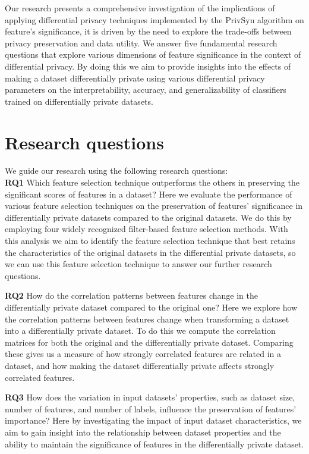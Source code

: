 Our research presents a comprehensive investigation of the implications of applying differential privacy techniques implemented by the PrivSyn algorithm \cite{privsyn} on feature's significance, it is driven by the need to explore the trade-offs between privacy preservation and data utility. We answer five fundamental research questions that explore various dimensions of feature significance in the context of differential privacy. By doing this we aim to provide insights into the effects of making a dataset differentially private using various differential privacy parameters on the interpretability, accuracy, and generalizability of classifiers trained on differentially private datasets.



\section{Research questions}
We guide our research using the following research questions:\\
\textbf{RQ1} Which feature selection technique outperforms the others in preserving the significant scores of features in a dataset?
Here we evaluate the performance of various feature selection techniques on the preservation of features' significance in differentially private datasets compared to the original datasets. We do this by employing four widely recognized filter-based feature selection methods. With this analysis we aim to identify the feature selection technique that best retains the characteristics of the original datasets in the differential private datasets, so we can use this feature selection technique to answer our further research questions.

\textbf{RQ2} How do the correlation patterns between features change in the differentially private dataset compared to the original one?
Here we explore how the correlation patterns between features change when transforming a dataset into a differentially private dataset. To do this we compute the correlation matrices for both the original and the differentially private dataset. Comparing these gives us a measure of how strongly correlated features are related in a dataset, and how making the dataset differentially private affects strongly correlated features.

\textbf{RQ3} How does the variation in input datasets’ properties, such as dataset size, number of features, and number of labels, influence the preservation of features’ importance?
Here by investigating the impact of input dataset characteristics, we aim to gain insight into the relationship between dataset properties and the ability to maintain the significance of features in the differentially private dataset.

